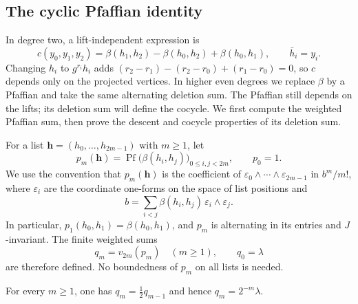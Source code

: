 \subsection{The cyclic Pfaffian identity}

In degree two, a lift-independent expression is
\[
 c(y_0,y_1,y_2)
 =\beta(h_1,h_2)-\beta(h_0,h_2)+\beta(h_0,h_1),
 \qquad \bar h_i=y_i.
\]
Changing $h_i$ to $g^{r_i}h_i$ adds
$(r_2-r_1)-(r_2-r_0)+(r_1-r_0)=0$, so $c$ depends only on the
projected vertices. In higher even degrees we replace $\beta$ by a
Pfaffian and take the same alternating deletion sum. The Pfaffian
still depends on the lifts; its deletion sum will define the cocycle.
We first compute the weighted Pfaffian sum, then prove the descent
and cocycle properties of its deletion sum.

For a list $\mathbf h=(h_0,\ldots,h_{2m-1})$ with $m\ge1$, let
\[
 p_m(\mathbf h)=\operatorname{Pf}
       \bigl(\beta(h_i,h_j)\bigr)_{0\le i,j<2m},
 \qquad p_0=1.
\]
We use the convention that $p_m(\mathbf h)$ is the coefficient of
$\varepsilon_0\wedge\cdots\wedge\varepsilon_{2m-1}$ in $b^m/m!$, where
$\varepsilon_i$ are the coordinate one-forms on the space of list positions
and
\[
 b=\sum_{i<j}\beta(h_i,h_j)\,
              \varepsilon_i\wedge\varepsilon_j.
\]
In particular, $p_1(h_0,h_1)=\beta(h_0,h_1)$, and $p_m$ is alternating in
its entries and $J$-invariant.  The finite weighted sums
\[
 q_m=v_{2m}(p_m)\quad(m\ge1),\qquad q_0=\lambda
\]
are therefore defined.  No boundedness of $p_m$ on all lists is needed.

\begin{lemma}\label{lem:pfaffian-recurrence}
For every $m\ge1$, one has $q_m=\tfrac12q_{m-1}$ and hence
$q_m=2^{-m}\lambda$.
\end{lemma}

